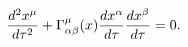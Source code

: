 \begin{equation}
\frac{d^{2}x^{\mu }}{d\tau ^{2}}+\Gamma _{\alpha \beta }^{\mu }(x)\frac{%
dx^{\alpha }}{d\tau }\frac{dx^{\beta }}{d\tau }=0.  \label{1}
\end{equation}

